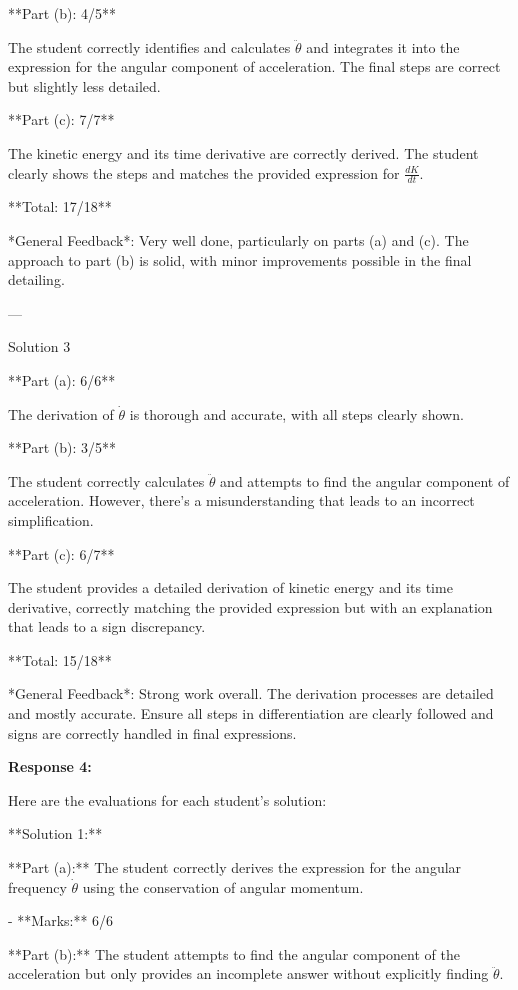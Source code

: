 \documentclass[a4paper,11pt]{article}
\begin{document}
**Part (b): 4/5**

The student correctly identifies and calculates \(\ddot{\theta}\) and integrates it into the expression for the angular component of acceleration. The final steps are correct but slightly less detailed.

**Part (c): 7/7**

The kinetic energy and its time derivative are correctly derived. The student clearly shows the steps and matches the provided expression for \(\frac{dK}{dt}\).

**Total: 17/18**

*General Feedback*: Very well done, particularly on parts (a) and (c). The approach to part (b) is solid, with minor improvements possible in the final detailing.

---

Solution 3

**Part (a): 6/6**

The derivation of \(\dot{\theta}\) is thorough and accurate, with all steps clearly shown.

**Part (b): 3/5**

The student correctly calculates \(\ddot{\theta}\) and attempts to find the angular component of acceleration. However, there's a misunderstanding that leads to an incorrect simplification.

**Part (c): 6/7**

The student provides a detailed derivation of kinetic energy and its time derivative, correctly matching the provided expression but with an explanation that leads to a sign discrepancy.

**Total: 15/18**

*General Feedback*: Strong work overall. The derivation processes are detailed and mostly accurate. Ensure all steps in differentiation are clearly followed and signs are correctly handled in final expressions.

\bigskip
\textbf{Response 4:}

Here are the evaluations for each student's solution:

**Solution 1:**

**Part (a):** The student correctly derives the expression for the angular frequency \( \dot{\theta} \) using the conservation of angular momentum.

- **Marks:** 6/6

**Part (b):** The student attempts to find the angular component of the acceleration but only provides an incomplete answer without explicitly finding \( \ddot{\theta} \).
\end{document}
